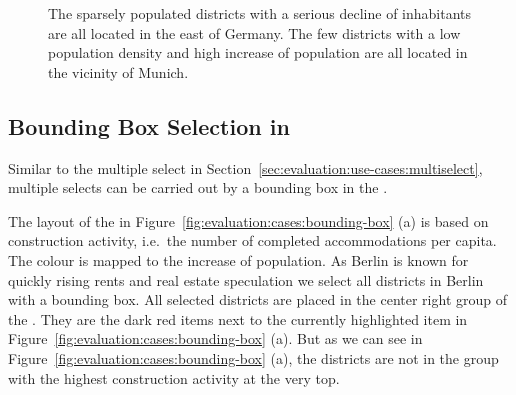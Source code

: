 \begin{figure}
  \centering
  \qquad
  \caption{
    The sparsely populated districts with a serious decline of inhabitants are all located in the east of Germany.
    The few districts with a low population density and high increase of population are all located in the vicinity of Munich.
  }\label{fig:evaluation:cases:multiselect:2}
\end{figure}

\subsection{Bounding Box Selection in \gv{}}\label{sec:evaluation:use-cases:bounding-box}
Similar to the multiple select in Section~\ref{sec:evaluation:use-cases:multiselect}, multiple selects can be carried out by a bounding box in the \gv{}.

The layout of the \tmap{} in Figure~\ref{fig:evaluation:cases:bounding-box} (a) is based on construction activity, i.e.\ the number of completed accommodations per capita.
The colour is mapped to the increase of population.
As Berlin is known for quickly rising rents and real estate speculation we select all districts in Berlin with a bounding box.
All selected districts are placed in the center right group of the \tmap{}.
They are the dark red items next to the currently highlighted item in Figure~\ref{fig:evaluation:cases:bounding-box} (a).
But as we can see in Figure~\ref{fig:evaluation:cases:bounding-box} (a), the districts are not in the group with the highest construction activity at the very top.

